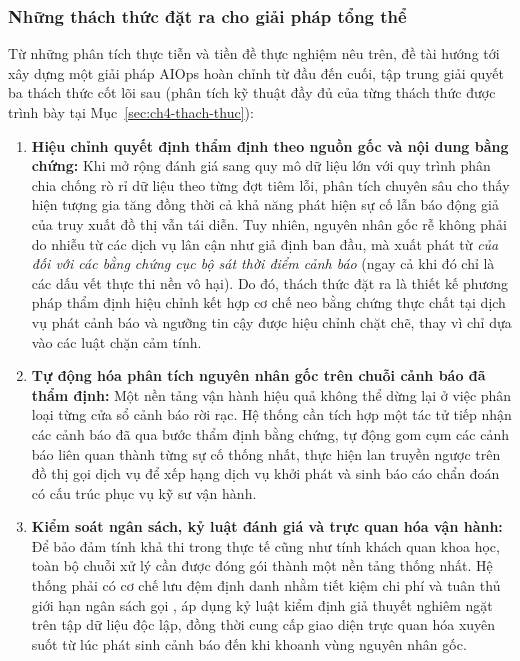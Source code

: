 \subsubsection{Những thách thức đặt ra cho giải pháp tổng thể}
\label{sec:ch1-thach-thuc}

Từ những phân tích thực tiễn và tiền đề thực nghiệm nêu trên, đề tài hướng tới xây dựng một giải pháp AIOps hoàn chỉnh từ đầu đến cuối, tập trung giải quyết ba thách thức cốt lõi sau (phân tích kỹ thuật đầy đủ của từng thách thức được trình bày tại Mục~\ref{sec:ch4-thach-thuc}):

\begin{enumerate}
    \item \textbf{Hiệu chỉnh quyết định thẩm định theo nguồn gốc và nội dung bằng chứng:} Khi mở rộng đánh giá sang quy mô dữ liệu lớn với quy trình phân chia chống rò rỉ dữ liệu theo từng đợt tiêm lỗi, phân tích chuyên sâu cho thấy hiện tượng gia tăng đồng thời cả khả năng phát hiện sự cố lẫn báo động giả của truy xuất đồ thị vẫn tái diễn. Tuy nhiên, nguyên nhân gốc rễ không phải do nhiễu từ các dịch vụ lân cận như giả định ban đầu, mà xuất phát từ \textit{ của  đối với các bằng chứng cục bộ sát thời điểm cảnh báo} (ngay cả khi đó chỉ là các dấu vết thực thi nền vô hại). Do đó, thách thức đặt ra là thiết kế phương pháp thẩm định hiệu chỉnh kết hợp cơ chế neo bằng chứng thực chất tại dịch vụ phát cảnh báo và ngưỡng tin cậy được hiệu chỉnh chặt chẽ, thay vì chỉ dựa vào các luật chặn cảm tính.
    
    \item \textbf{Tự động hóa phân tích nguyên nhân gốc trên chuỗi cảnh báo đã thẩm định:} Một nền tảng vận hành hiệu quả không thể dừng lại ở việc phân loại từng cửa sổ cảnh báo rời rạc. Hệ thống cần tích hợp một tác tử  tiếp nhận các cảnh báo đã qua bước thẩm định bằng chứng, tự động gom cụm các cảnh báo liên quan thành từng sự cố thống nhất, thực hiện lan truyền ngược trên đồ thị gọi dịch vụ để xếp hạng dịch vụ khởi phát và sinh báo cáo chẩn đoán có cấu trúc phục vụ kỹ sư vận hành.
    
    \item \textbf{Kiểm soát ngân sách, kỷ luật đánh giá và trực quan hóa vận hành:} Để bảo đảm tính khả thi trong thực tế cũng như tính khách quan khoa học, toàn bộ chuỗi xử lý cần được đóng gói thành một nền tảng thống nhất. Hệ thống phải có cơ chế lưu đệm định danh nhằm tiết kiệm chi phí và tuân thủ giới hạn ngân sách gọi , áp dụng kỷ luật kiểm định giả thuyết nghiêm ngặt trên tập dữ liệu độc lập, đồng thời cung cấp giao diện trực quan hóa xuyên suốt từ lúc phát sinh cảnh báo đến khi khoanh vùng nguyên nhân gốc.
\end{enumerate}

